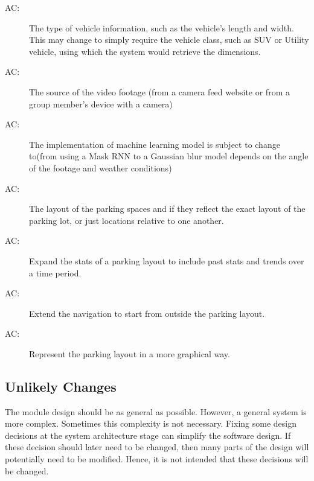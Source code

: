 \documentclass[12pt, titlepage]{article}
\newcounter{acnum}
\newcommand{\actheacnum}{AC\theacnum}
\begin{document}
\begin{description}
\item[ \actheacnum \label{ac1}:] 
The type of vehicle information, such as the vehicle's length and width. This
may change to simply require the vehicle class, such as SUV or Utility vehicle,
using which the system would retrieve the dimensions.

\item[ \actheacnum \label{ac2}:] The source of the video
footage (from a camera feed website or from a group member's device with a
camera)

\item[ \actheacnum \label{ac3}:] The implementation of
machine learning model is subject to change to(from using a Mask RNN to a
Gaussian blur model depends on the angle of the footage and weather conditions)

\item[ \actheacnum \label{ac4}:] The layout of the parking
spaces and if they reflect the exact layout of the parking lot, or just
locations relative to one another.

\item[ \actheacnum \label{ac5}:] Expand the stats of a
parking layout to include past stats and trends over a time period.

\item[ \actheacnum \label{ac6}:] Extend the navigation to
start from outside the parking layout.

\item[ \actheacnum \label{ac7}:] Represent the parking
layout in a more graphical way.

\end{description}

\subsection{Unlikely Changes} \label{SecUchange}

The module design should be as general as possible. However, a general system is
more complex. Sometimes this complexity is not necessary. Fixing some design
decisions at the system architecture stage can simplify the software design. If
these decision should later need to be changed, then many parts of the design
will potentially need to be modified. Hence, it is not intended that these
decisions will be changed.
\end{document}
